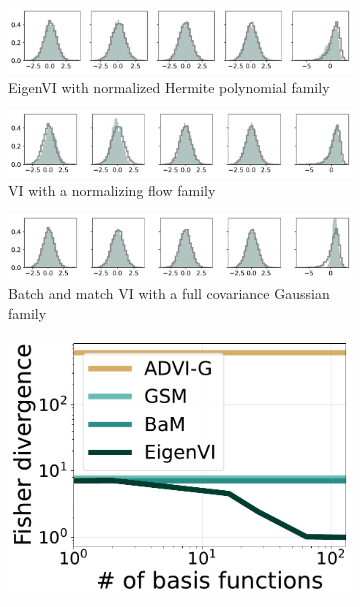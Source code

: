 \begin{figure}[t]
    \centering
    \begin{subfigure}[b]{\linewidth}
        \centering
        \includegraphics[scale=0.37]{figs/expts-pdb/PDB_85_samples_eigenvi.pdf}
        \caption{EigenVI with normalized Hermite polynomial family}
    \end{subfigure}
    \begin{subfigure}[b]{\linewidth}
    \centering
        \includegraphics[scale=0.37]{figs/expts-pdb/PDB_85_samples_flows.pdf}
        \caption{VI with a normalizing flow family}
    \end{subfigure}
    \begin{subfigure}[b]{\linewidth}
    \centering
        \includegraphics[scale=0.37]{figs/expts-pdb/PDB_85_samples_bam.pdf}
    \caption{Batch and match VI with a full covariance Gaussian family}
    \vspace{5pt}
    \end{subfigure}
    \begin{subfigure}[b]{0.245\linewidth}
        \centering
        \includegraphics[scale=0.21]{figs/expts-pdb/PDB_27_scores_noflow.pdf}

\end{subfigure}
\end{figure}
